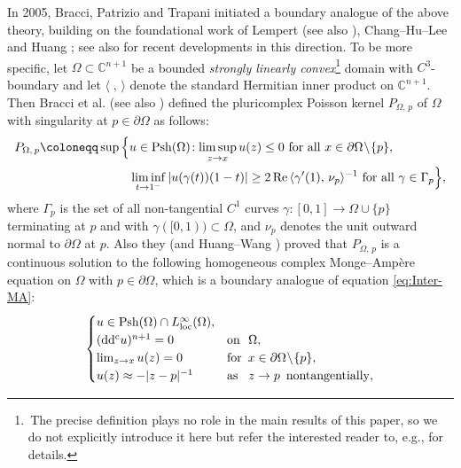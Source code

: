 \documentclass[12pt,a4paper]{amsart}
\numberwithin{equation}{section}
\theoremstyle{definition}
\newcommand{\ddc}{{\rm dd^c}}
\begin{document}
In 2005, Bracci, Patrizio and Trapani \cite{Bracci-MathAnn05, Bracci-Trans09} initiated a boundary analogue of the above theory, building on the foundational work of Lempert \cite{Lempert81, Lempert84} (see also \cite{Abatebook, KW13}), Chang--Hu--Lee \cite{Chang--Hu--Lee88} and Huang \cite{Huang-Illinois94, Huang-Pisa94}; see also \cite{Huang-Wang22, Bracci-Adv21, Wang24, ABF25} for recent developments in this direction. To be more specific, let $\Omega\subset\mathbb C^{n+1}$ be a bounded \textit{strongly linearly convex}\footnote{\,The precise definition plays no role in the main results of this paper, so we do not explicitly introduce it here but refer the interested reader to, e.g., \cite{Andersson04, Huang-Wang22} for details.} domain with $C^3$-boundary and let $\langle\;,\,\rangle$ denote the standard Hermitian inner product on $\mathbb C^{n+1}$.
Then Bracci et al. \cite{Bracci-MathAnn05, Bracci-Trans09} (see also \cite{Huang-Wang22, Bracci-Adv21}) defined the pluricomplex Poisson kernel $P_{\Omega,\, p}$ of $\Omega$ with singularity at $p\in\partial\Omega$ as follows:
\begin{equation*}\label{Poissonkernel}
  \begin{split}
   P_{\Omega,\, p}
   \coloneqq \sup\Big\{&u\in {\rm Psh}(\Omega)\!: \limsup_{z\to x} u(z)\leq 0 \ \hbox{for all}
   \ x\in \partial \Omega\!\setminus\!\{p\},\\
   &\liminf_{t\to 1^{-}} |u(\gamma(t))(1-t)|
   \geq 2\,{\rm Re}\, \langle\gamma'(1),\, \nu_p\rangle^{-1} \ \hbox{for all}\ \gamma\in \Gamma_p
   \Big\},
  \end{split}
\end{equation*}
where $\Gamma_p$ is the set of all non-tangential $C^1$ curves $\gamma\!:[0, 1]\to \Omega\cup\{p\}$ terminating at $p$ and with $\gamma([0,1))\subset\Omega$, and $\nu_p$ denotes the unit outward normal to $\partial\Omega$ at $p$. Also they (and Huang--Wang  \cite{Huang-Wang22}) proved that $P_{\Omega,\, p}$ is a continuous solution to the following homogeneous complex Monge--Amp\`{e}re equation on $\Omega$ with $p\in\partial\Omega$, which is a boundary analogue of equation \eqref{eq:Inter-MA}:
\begin{equation}\label{eq:Bdry-MA}
  \begin{cases}
   u\in {\rm Psh}(\Omega)\cap L_{{\rm loc}}^{\infty}(\Omega), \\
   (\ddc u)^{n+1}=0         &{\rm on} \,\,\ \Omega, \\
   \lim_{z\to x}u(z)=0      &{\rm for} \,\  x\in\partial\Omega\!\setminus\!\{p\}, \\
   u(z)\approx -|z-p|^{-1}  &{\rm as}  \, \ \ z\to p\, \ {\rm nontangentially},
  \end{cases}
\end{equation}
\end{document}
